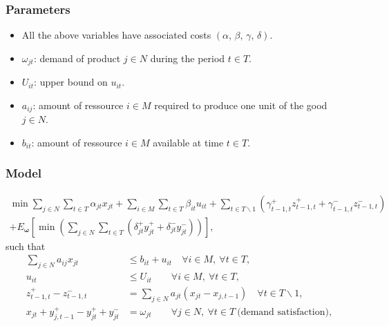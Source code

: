 \documentclass{beamer}
\def\bomega{\boldsymbol\omega}
\begin{document}
\begin{frame}
\frametitle{Parameters}

\begin{itemize}
\item
All the above variables have associated costs $(\alpha,\,\beta,\,\gamma,\,\delta)$.
\item
$\omega_{jt}$: demand of product $j \in N$ during the period $t
\in T$.
\item
$U_{it}$: upper bound on $u_{it}$.
\item
$a_{ij}$: amount of ressource $i \in M$ required to produce one unit of the good $j \in N$.
\item
$b_{it}$: amount of ressource $i \in M$ available at time $t \in T$.
\end{itemize}

\end{frame}

\begin{frame}
\frametitle{Model}

\begin{multline*}
\min \sum_{j \in N} \sum_{t \in T} \alpha_{jt} x_{jt} + \sum_{i \in M}
\sum_{t \in T} \beta_{it} u_{it} + \sum_{t \in T\backslash 1} \left(
  \gamma^+_{t-1,t} z^+_{t-1,t} + \gamma^-_{t-1,t} z^-_{t-1,t} \right) \\
+ E_{\bomega} \left[ \min \left( \sum_{j \in N} \sum_{t \in T}
    ( \delta_{jt}^+y_{jt}^+ + \delta_{jt}^-y_{jt}^- ) \right) \right],
\end{multline*}
such that
\begin{align*}
\sum_{j \in N} a_{ij} x_{jt} & \leq b_{it}+u_{it} \quad \forall i \in
M,\ \forall t \in T,\\
u_{it} & \leq U_{it} \qquad \forall i \in M,\ \forall t \in T,\\
z^+_{t-1,t} - z^-_{t-1,t} &= \sum_{j \in N} a_{jt}(x_{jt} - x_{j,
  t-1}) \quad \forall t \in T\backslash 1, \\
x_{jt} + y_{j,t-1}^+ - y_{jt}^+ + y_{jt}^- &= \omega_{jt} \qquad
\forall j \in N,\ \forall t \in T\ \mbox{(demand satisfaction)},\\
\end{align*}
\end{frame}
\end{document}
